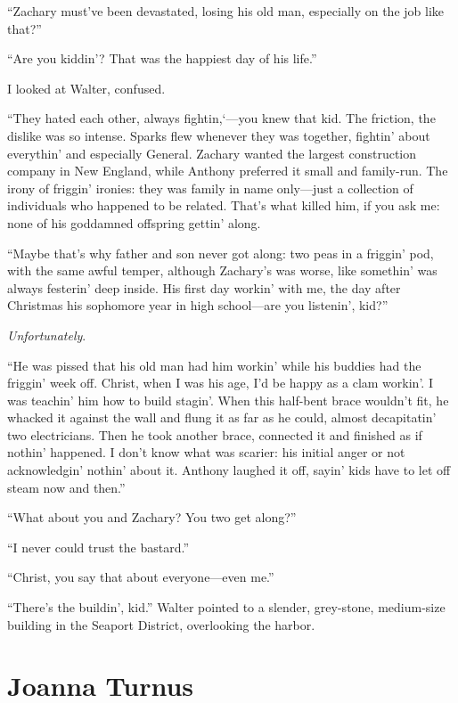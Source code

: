 ``Zachary must've been devastated, losing his old man, especially on the
job like that?''

``Are you kiddin'? That was the happiest day of his life.''

I looked at Walter, confused.

``They hated each other, always fightin,`---you knew that kid. The
friction, the dislike was so intense. Sparks flew whenever they was
together, fightin' about everythin' and especially General. Zachary
wanted the largest construction company in New England, while Anthony
preferred it small and family-run. The irony of friggin' ironies: they
was family in name only---just a collection of individuals who happened
to be related. That's what killed him, if you ask me: none of his
goddamned offspring gettin' along.

``Maybe that's why father and son never got along: two peas in a
friggin' pod, with the same awful temper, although Zachary's was worse,
like somethin' was always festerin' deep inside. His first day workin'
with me, the day after Christmas his sophomore year in high school---are
you listenin', kid?''

\emph{Unfortunately}.

``He was pissed that his old man had him workin' while his buddies had
the friggin' week off. Christ, when I was his age, I'd be happy as a
clam workin'. I was teachin' him how to build stagin'. When this
half-bent brace wouldn't fit, he whacked it against the wall and flung
it as far as he could, almost decapitatin' two electricians. Then he
took another brace, connected it and finished as if nothin' happened. I
don't know what was scarier: his initial anger or not acknowledgin'
nothin' about it. Anthony laughed it off, sayin' kids have to let off
steam now and then.''

``What about you and Zachary? You two get along?''

``I never could trust the bastard.''

``Christ, you say that about everyone---even me.''

``There's the buildin', kid.'' Walter pointed to a slender, grey-stone,
medium-size building in the Seaport District, overlooking the harbor.

\chapter{Joanna Turnus}

\titlemark

